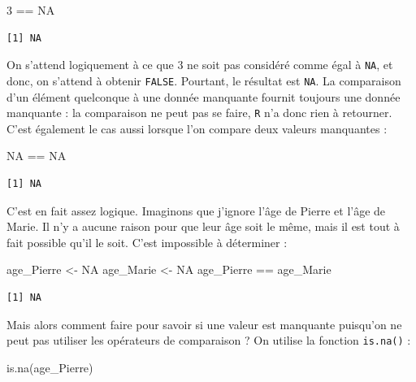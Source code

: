 \documentclass[
  a4paper,
  DIV=11,
  numbers=noendperiod,
  oneside]{scrreprt}
\newenvironment{Shaded}{}{}
\newcommand{\ConstantTok}[1]{\textcolor[rgb]{0.00,0.36,0.77}{#1}}
\newcommand{\DecValTok}[1]{\textcolor[rgb]{0.00,0.36,0.77}{#1}}
\newcommand{\FunctionTok}[1]{\textcolor[rgb]{0.44,0.26,0.76}{#1}}
\newcommand{\NormalTok}[1]{\textcolor[rgb]{0.14,0.16,0.18}{#1}}
\newcommand{\OtherTok}[1]{\textcolor[rgb]{0.44,0.26,0.76}{#1}}
\newcommand{\SpecialCharTok}[1]{\textcolor[rgb]{0.00,0.36,0.77}{#1}}
\begin{document}
\begin{Shaded}
\begin{Highlighting}[]
\DecValTok{3} \SpecialCharTok{==} \ConstantTok{NA}
\end{Highlighting}
\end{Shaded}

\begin{verbatim}
[1] NA
\end{verbatim}

On s'attend logiquement à ce que 3 ne soit pas considéré comme égal à
\texttt{NA}, et donc, on s'attend à obtenir \texttt{FALSE}. Pourtant, le
résultat est \texttt{NA}. La comparaison d'un élément quelconque à une
donnée manquante fournit toujours une donnée manquante : la comparaison
ne peut pas se faire, \texttt{R} n'a donc rien à retourner. C'est
également le cas aussi lorsque l'on compare deux valeurs manquantes :

\begin{Shaded}
\begin{Highlighting}[]
\ConstantTok{NA} \SpecialCharTok{==} \ConstantTok{NA}
\end{Highlighting}
\end{Shaded}

\begin{verbatim}
[1] NA
\end{verbatim}

C'est en fait assez logique. Imaginons que j'ignore l'âge de Pierre et
l'âge de Marie. Il n'y a aucune raison pour que leur âge soit le même,
mais il est tout à fait possible qu'il le soit. C'est impossible à
déterminer :

\begin{Shaded}
\begin{Highlighting}[]
\NormalTok{age\_Pierre }\OtherTok{\textless{}{-}} \ConstantTok{NA}
\NormalTok{age\_Marie }\OtherTok{\textless{}{-}} \ConstantTok{NA}
\NormalTok{age\_Pierre }\SpecialCharTok{==}\NormalTok{ age\_Marie}
\end{Highlighting}
\end{Shaded}

\begin{verbatim}
[1] NA
\end{verbatim}

Mais alors comment faire pour savoir si une valeur est manquante
puisqu'on ne peut pas utiliser les opérateurs de comparaison ? On
utilise la fonction \texttt{is.na()} :

\begin{Shaded}
\begin{Highlighting}[]
\FunctionTok{is.na}\NormalTok{(age\_Pierre)}
\end{Highlighting}
\end{Shaded}
\end{document}
